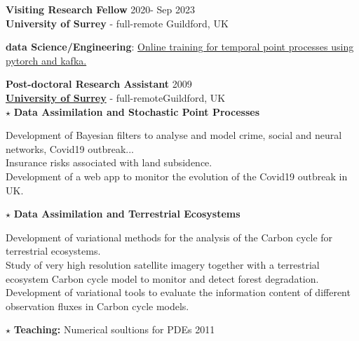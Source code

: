 \documentclass[11 pt,oneside,a4paper,titlepage]{article}
\begin{document}
{\begin{minipage}{12.3cm}
        \textbf{Visiting Research Fellow} \hfill 2020\-- Sep 2023\\
        \textbf{University of Surrey} \-- full-remote \hfill Guildford, UK\\

        \vspace*{-0.2cm}
        \hspace*{0.2cm}
        \begin{minipage}{12cm}
            {\bullet} \textbf{data Science/Engineering}: \href{https://sdelahaies.github.io/enpgf-lab.html}{Online training for temporal point processes using pytorch and kafka.}\\
        \end{minipage}

        \textbf{Post-doctoral Research Assistant} \hfill 2009\\
        \textbf{\href{https://www.surrey.ac.uk/department-mathematics}{University of Surrey}} \-- full-remote\hfill Guildford, UK\\
        $\star$ \textbf{Data Assimilation and Stochastic Point Processes}\\
        
        \vspace*{-0.2cm}
        \hspace*{0.2cm}
        \begin{minipage}{12cm}
            {\bullet} Development of Bayesian filters to analyse and model crime, social and neural networks, Covid19 outbreak...\\
            {\bullet} Insurance risks associated with land subsidence.\\
            {\bullet} Development of a web app to monitor the evolution of the Covid19 outbreak in UK.\\
        \end{minipage}

        $\star$ \textbf{Data Assimilation and Terrestrial Ecosystems}\\
        
        \vspace*{-0.2cm}
        \hspace*{0.2cm}
        \begin{minipage}{12cm}
            {\bullet} Development of variational methods for the analysis of the Carbon cycle for terrestrial ecosystems.\\
            {\bullet} Study of very high resolution satellite imagery together with a terrestrial ecosystem Carbon cycle model to monitor and detect forest degradation.\\
            {\bullet} Development of variational tools to evaluate the information content of different observation fluxes in Carbon cycle models. \\
        \end{minipage}

        $\star$ \textbf{Teaching:} Numerical soultions for PDEs \hfill 2011\\
    \end{minipage}} %
\end{document}
